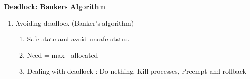 \centerline{\textbf{ \LARGE Deadlock: Bankers Algorithm}}



\begin{enumerate}

  \item Avoiding deadlock (Banker's algorithm)
  \begin{enumerate}
    \item Safe state and avoid unsafe states.
    \item Need = max - allocated
    \item Dealing with deadlock : Do nothing, Kill processes, Preempt and rollback
  \end{enumerate}

\end{enumerate}









